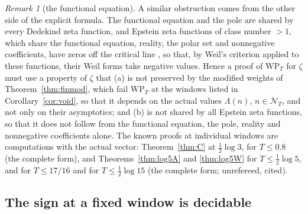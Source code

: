 \documentclass[11pt]{amsart}
\theoremstyle{definition}
\theoremstyle{remark}
\newtheorem{remark}[theorem]{Remark}
\newcommand{\NT}{\mathcal N_T}
\begin{document}
\begin{remark}[the functional equation]\label{rem:twohalves}
A similar obstruction comes from the other side of the explicit formula. The functional equation and the
pole are shared by every Dedekind zeta function, and Epstein zeta functions of class number $>1$, which
share the functional equation, reality, the polar set and nonnegative coefficients, have zeros off the
critical line \cite{DavenportHeilbronn1936}, so that, by Weil's criterion \cite{Weil52} applied to these
functions, their Weil forms take negative values. Hence a proof of $\mathrm{WP}_T$ for $\zeta$ must use a
property of $\zeta$ that (a) is not preserved by the modified weights of Theorem~\ref{thm:finmod}, which fail
$\mathrm{WP}_T$ at the windows listed in Corollary~\ref{cor:void}, so that it depends on the actual values
$\Lambda(n)$, $n\in\NT$, and not only on their asymptotics; and (b) is not shared by all Epstein zeta
functions, so that it does not follow from the functional equation, the pole, reality and nonnegative
coefficients alone. The known proofs at individual windows are computations with the actual vector:
Theorem~\ref{thm:C} at $\frac12\log3$, \cite[Thm.~1.2]{Zhu2026} for $T\le0.8$ (the complete form), and
Theorems~\ref{thm:log5A} and \ref{thm:log5W} for $T\le\frac12\log5$, and \cite[Thm.~B]{Liu2026} for
$T\le17/16$ and \cite{Mori15} for $T\le\frac12\log15$ (the complete form; unrefereed, cited).
\end{remark}



\subsection{The sign at a fixed window is decidable}
\end{document}
